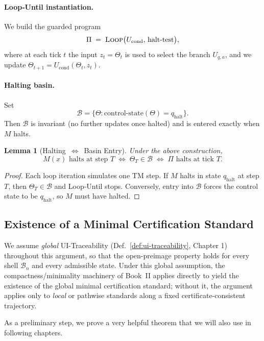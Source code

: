 \documentclass[12pt]{article}
\theoremstyle{definition}
\theoremstyle{plain}
\newtheorem{lemma}{Lemma}[section]
\begin{document}
\paragraph{Loop‑Until instantiation.}  
We build the guarded program
\[
  \Pi \;=\; \textsc{Loop}\bigl(U_{\mathrm{cond}},\,\text{halt‑test}\bigr),
\]
where at each tick \(t\) the input \(z_t=\Theta_t\) is used to select the branch \(U_{q,a}\), and we update \(\Theta_{t+1}=U_{\mathrm{cond}}(\Theta_t,z_t)\).

\paragraph{Halting basin.}  
Set
\[
  \mathcal B = \{\Theta : \text{control‑state}(\Theta)=q_{\mathrm{halt}}\}.
\]
Then \(\mathcal B\) is invariant (no further updates once halted) and is entered exactly when \(M\) halts.

\begin{lemma}[Halting \(\iff\) Basin Entry]
\label{lem:halt-basin}
Under the above construction,
\[
  M(x)\text{ halts at step }T
  \;\iff\;
  \Theta_T\in\mathcal B
  \;\iff\;
  \Pi\text{ halts at tick }T.
\]
\end{lemma}

\begin{proof}
Each loop iteration simulates one TM step.  If \(M\) halts in state \(q_{\mathrm{halt}}\) at step \(T\), then \(\Theta_T\in\mathcal B\) and Loop‑Until stops.  Conversely, entry into \(\mathcal B\) forces the control state to be \(q_{\mathrm{halt}}\), so \(M\) must have halted.
\end{proof}

\subsection{Existence of a Minimal Certification Standard}
\label{subsec:min-standard-exists}
We assume \emph{global} UI-Traceability (Def.~\ref{def:ui-traceability}, Chapter 1) throughout this argument, so that the open-preimage property holds for every shell $\mathcal{B}_n$ and every admissible state.  
Under this global assumption, the compactness/minimality machinery of Book~II applies directly to yield the existence of the global minimal certification standard; without it, the argument applies only to \emph{local} or pathwise standards along a fixed certificate-consistent trajectory.

As a preliminary step, we prove a very helpful theorem that we will also use in following chapters.
\end{document}

